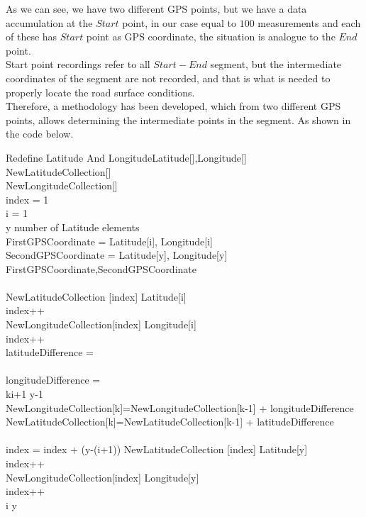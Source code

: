 \documentclass[tesi]{subfiles}
\begin{document}
\noindent As we can see, we have two different GPS points, but we have a data accumulation at the $Start$ point, in our case equal to $100$ measurements and each of these has $Start$ point as GPS coordinate, the situation is analogue to the $End$ point.\\
Start point recordings refer to all $Start-End$ segment, but the intermediate coordinates of the segment are not recorded, and that is what is needed to properly locate the road surface conditions.\\
Therefore, a methodology has been developed, which from two different GPS points, allows determining the intermediate points in the segment. As shown in the code below.\\
\begin{pseudocode}{Redefine Latitude And Longitude}{Latitude[],Longitude[]}
\label{alg:Redefine Latitude And Longitude}
\\
\BEGIN
NewLatitudeCollection[]\\
NewLongitudeCollection[]\\
index = 1\\ 
i = 1\\
\FOR y \TO number \thinspace of \thinspace
Latitude \thinspace elements \DO \\
\BEGIN
FirstGPSCoordinate = Latitude[i], Longitude[i]\\
SecondGPSCoordinate = Latitude[y], Longitude[y]\\
\IF {} {FirstGPSCoordinate,SecondGPSCoordinate}  \DO\\
\BEGIN
{}\\
NewLatitudeCollection [index] \GETS Latitude[i]\\
index++\\
NewLongitudeCollection[index] \GETS Longitude[i]\\
index++\\
latitudeDifference = \\\\
longitudeDifference = \\
\FOR k\GETS i+1 \TO y-1\DO \\
\BEGIN
NewLongitudeCollection[k]=NewLongitudeCollection[k-1] + longitudeDifference\\
NewLatitudeCollection[k]=NewLatitudeCollection[k-1] + latitudeDifference\\
\END \\
index = index + (y-(i+1))
NewLatitudeCollection [index] \GETS Latitude[y]\\
index++\\
NewLongitudeCollection[index] \GETS Longitude[y]\\
index++\\
i \GETS y\\ 
\END
\END
\END
\end{pseudocode} 	
\end{document}
